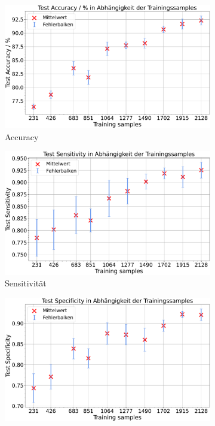 \begin{figure}[H]
  \centering
  \begin{subfigure}[b]{0.48\textwidth}
    \centering
    \includegraphics[width=\textwidth]{plots/3-Messungen-Gli-Men_Accuracy_mean.pdf}
    \caption{Accuracy}
    \label{fig:gli-men-acc}
  \end{subfigure}
  \begin{subfigure}[b]{0.48\textwidth}
    \centering
    \includegraphics[width=\textwidth]{plots/3-Messungen-Gli-Men_Sensitivity_mean.pdf}
    \caption{Sensitivität}
    \label{fig:gli-men-sens}
  \end{subfigure}
  \begin{subfigure}[b]{0.48\textwidth}
    \centering
    \includegraphics[width=\textwidth]{plots/3-Messungen-Gli-Men_Specificity_mean.pdf}

\end{subfigure}
\end{figure}
